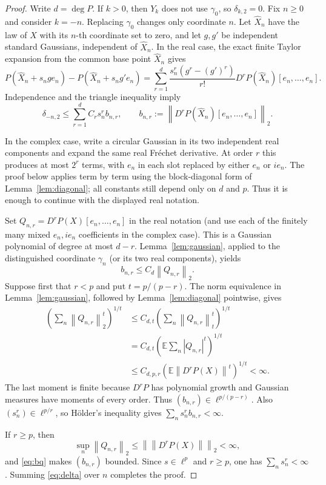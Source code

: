 \documentclass[11pt]{article}
\newcommand{\E}{\mathbb E}
\newcommand{\norm}[1]{\left\lVert #1\right\rVert}
\begin{document}
\begin{proof}
Write $d=\deg P$.  If $k>0$, then $Y_k$ does not use $\gamma_0$, so $\delta_{k,2}=0$.  Fix $n\ge0$ and consider $k=-n$.  Replacing $\gamma_0$ changes only coordinate $n$.  Let $\widehat X_n$ have the law of $X$ with its $n$-th coordinate set to zero, and let $g,g'$ be independent standard Gaussians, independent of $\widehat X_n$.  In the real case, the exact finite Taylor expansion from the common base point $\widehat X_n$ gives
\[
 P(\widehat X_n+s_ng e_n)-P(\widehat X_n+s_ng'e_n)
 =\sum_{r=1}^d\frac{s_n^r(g^r-(g')^r)}{r!}
 D^rP(\widehat X_n)[e_n,\ldots,e_n].
\]
Independence and the triangle inequality imply
\begin{equation}\label{eq:delta}
 \delta_{-n,2}\le\sum_{r=1}^d C_r s_n^r b_{n,r},\qquad
 b_{n,r}:=\norm{D^rP(\widehat X_n)[e_n,\ldots,e_n]}_2.
\end{equation}

In the complex case, write a circular Gaussian in its two independent real components and expand the same real Fr\'echet derivative.  At order $r$ this produces at most $2^r$ terms, with $e_n$ in each slot replaced by either $e_n$ or $ie_n$.  The proof below applies term by term using the block-diagonal form of Lemma~\ref{lem:diagonal}; all constants still depend only on $d$ and $p$.  Thus it is enough to continue with the displayed real notation.

Set $Q_{n,r}=D^rP(X)[e_n,\ldots,e_n]$ in the real notation (and use each of the finitely many mixed $e_n,ie_n$ coefficients in the complex case).  This is a Gaussian polynomial of degree at most $d-r$.  Lemma~\ref{lem:gaussian}, applied to the distinguished coordinate $\gamma_n$ (or its two real components), yields
\begin{equation}\label{eq:bq}
 b_{n,r}\le C_d\norm{Q_{n,r}}_2.
\end{equation}
Suppose first that $r<p$ and put $t=p/(p-r)$.  The norm equivalence in Lemma~\ref{lem:gaussian}, followed by Lemma~\ref{lem:diagonal} pointwise, gives
\begin{align*}
 \left(\sum_n\norm{Q_{n,r}}_2^t\right)^{1/t}
 &\le C_{d,t}\left(\sum_n\norm{Q_{n,r}}_t^t\right)^{1/t}\\
 &=C_{d,t}\left(\E\sum_n|Q_{n,r}|^t\right)^{1/t}\\
 &\le C_{d,p,r}\left(\E\norm{D^rP(X)}^t\right)^{1/t}<\infty.
\end{align*}
The last moment is finite because $D^rP$ has polynomial growth and Gaussian measures have moments of every order.  Thus $(b_{n,r})\in\ell^{p/(p-r)}$.  Also $(s_n^r)\in\ell^{p/r}$, so H\"older's inequality gives
$\sum_ns_n^rb_{n,r}<\infty$.

If $r\ge p$, then
\[
 \sup_n\norm{Q_{n,r}}_2\le\norm{\norm{D^rP(X)}}_2<\infty,
\]
and \eqref{eq:bq} makes $(b_{n,r})$ bounded.  Since $s\in\ell^p$ and $r\ge p$, one has $\sum_ns_n^r<\infty$.  Summing \eqref{eq:delta} over $n$ completes the proof.
\end{proof}
\end{document}
